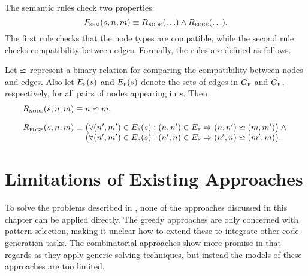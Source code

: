 \def\mSemNodeRule{R_{\mathsc{node}}}
\def\mSemEdgeRule{R_{\mathsc{edge}}}

The semantic rules check two properties:
%
\begin{equation}
  \mSemRuleCheck(s, n, m) \equiv
  \mSemNodeRule(\ldots) \mAnd \mSemEdgeRule(\ldots).
\end{equation}
%
The first rule checks that the \gls{node} types are compatible, while the second
rule checks compatibility between \glspl{edge}.
%
Formally, the rules are defined as follows.
%
\begin{definition}
  Let $\backsimeq$ represent a binary relation for comparing the
  compatibility between \glspl{node} and \glspl{edge}.
  Also let $E_{\textrm{\textsc{f}}}(s)$ and $E_{\textrm{\textsc{p}}}(s)$ denote the sets of \glspl{edge} in $G_{\textrm{\textsc{f}}}$ and
  $G_{\textrm{\textsc{p}}}$, respectively, for all pairs of \glspl{node} appearing in $s$.
  Then
  \begin{displaymath}
    \begin{array}{r@{}l}
        \mSemNodeRule(s, n, m) \equiv \mbox{}
      & n \mVFTwoAttrCmp m, \\[\abovedisplayskip]
        \mSemEdgeRule(s, n, m) \equiv \mbox{}
      & \big(
        \forall \mPair{n'}{m'} \in \fE(s) :
        \mPair{n}{n'} \in \fE \mImp \mPair{n}{n'} \mVFTwoAttrCmp \mPair{m}{m'}
        \big) \mAnd \mbox{} \\
      & \big(
        \forall \mPair{n'}{m'} \in \fE(s) :
        \mPair{n'}{n} \in \fE \mImp \mPair{n'}{n} \mVFTwoAttrCmp \mPair{m'}{m}
        \big).
    \end{array}
  \end{displaymath}%
\end{definition}


\section{Limitations of Existing Approaches}

To solve the problems described in , none of the
approaches discussed in this chapter can be applied directly.
%
The greedy approaches are only concerned with \gls{pattern selection}, making it
unclear how to extend these to integrate other \gls{code generation} tasks.
%
The combinatorial approaches show more promise in that regards as they apply
generic solving techniques, but instead the models of these approaches are too
limited.

